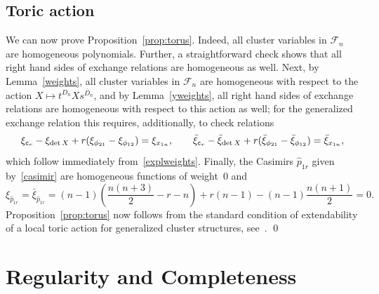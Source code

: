 \documentclass{amsart}
\theoremstyle{definition}
\theoremstyle{remark}
\numberwithin{equation}{section}
\numberwithin{theorem}{section}
\def\FF{{\mathcal F}}
\def\ec{{\tt c}}
\begin{document}
\subsection{Toric action} 
We can now prove Proposition~\ref{prop:torus}. Indeed, all cluster variables in $\FF_n$ are homogeneous polynomials. Further, a straightforward check shows that all right hand sides of exchange relations are homogeneous as well.
Next, by Lemma~\ref{weights}, all cluster variables in $\FF_n$ are homogeneous with respect to the action 
$X\mapsto t^{D_n}Xs^{\bar D_n}$, and by Lemma~\ref{yweights}, all right hand sides of exchange relations are homogeneous with respect to this action as well; for the generalized exchange relation this requires, additionally,
to check relations
\[
\xi_{\ec_r}-\xi_{\det X}+r(\xi_{\phi_{21}}-\xi_{\phi_{12}})=\xi_{x_{1n}},\qquad
\bar\xi_{\ec_r}-\bar\xi_{\det X}+r(\bar\xi_{\phi_{21}}-\bar\xi_{\phi_{12}})=\bar\xi_{x_{1n}},
\]
which follow immediately from~\eqref{explweights}. Finally, the Casimirs $\hat p_{1r}$ given by~\eqref{casimir} are homogeneous functions of weight~0 and
\[
\xi_{\hat p_{1r}}=\bar\xi_{\hat p_{1r}}=(n-1)\left(\frac{n(n+3)}2-r-n\right)+r(n-1)-(n-1)\frac{n(n+1)}2=0.
\]
Proposition~\ref{prop:torus} now follows from the standard condition of extendability of a local toric action for generalized cluster structures, see~\cite[Proposition 2.6]{GSVdouble}. \qed

\section{Regularity and Completeness}\label{regcomplet}
\end{document}

